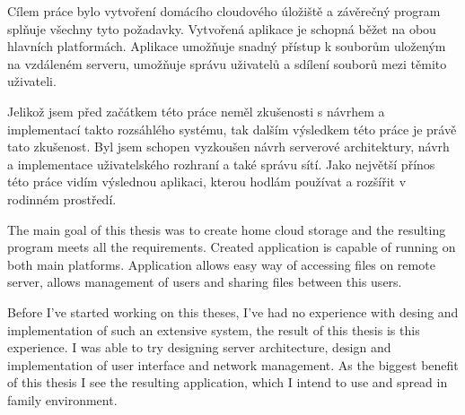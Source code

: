 \documentclass[
  glossaries,
]{kidiplom}
\begin{document}
\begin{kiconclusions}
Cílem práce bylo vytvoření domácího cloudového úložiště a závěrečný program splňuje všechny tyto požadavky. Vytvořená aplikace je schopná běžet na obou hlavních platformách. Aplikace umožňuje snadný přístup k souborům uloženým na vzdáleném serveru, umožňuje správu uživatelů a sdílení souborů mezi těmito uživateli. 

Jelikož jsem před začátkem této práce neměl zkušenosti s návrhem a implementací takto rozsáhlého systému, tak dalším výsledkem této práce je právě tato zkušenost. Byl jsem schopen vyzkoušen návrh serverové architektury, návrh a implementace uživatelského rozhraní a také správu sítí. Jako největší přínos této práce vidím výslednou aplikaci, kterou hodlám používat a rozšířit v rodinném prostředí.

\end{kiconclusions}

\begin{kiconclusions}[english]
The main goal of this thesis was to create home cloud storage and the resulting program meets all the requirements. Created application is capable of running on both main platforms. Application allows easy way of accessing files on remote server, allows management of users and sharing files between this users.

Before I've started working on this theses, I've had no experience with desing and implementation of such an extensive system, the result of this thesis is this experience. I was able to try designing server architecture, design and implementation of user interface and network management. As the biggest benefit of this thesis I see the resulting application, which I intend to use and spread in family environment.


\end{kiconclusions}
\end{document}
